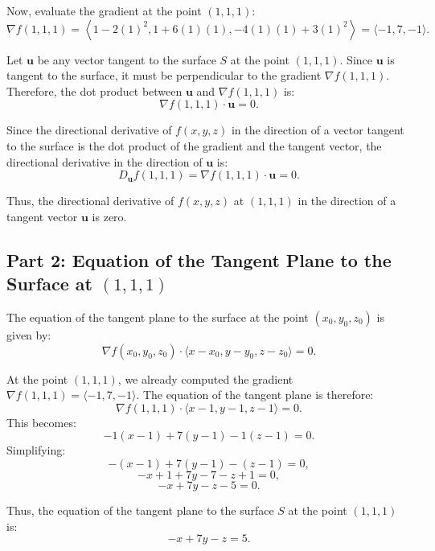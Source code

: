 \documentclass[11pt]{article}
\begin{document}
Now, evaluate the gradient at the point \( (1, 1, 1) \):
\[
\nabla f(1, 1, 1) = \left\langle 1 - 2(1)^2, 1 + 6(1)(1), -4(1)(1) + 3(1)^2 \right\rangle = \langle -1, 7, -1 \rangle.
\]

Let \( \mathbf{u} \) be any vector tangent to the surface \( S \) at the point \( (1, 1, 1) \). Since \( \mathbf{u} \) is tangent to the surface, it must be perpendicular to the gradient \( \nabla f(1, 1, 1) \). Therefore, the dot product between \( \mathbf{u} \) and \( \nabla f(1, 1, 1) \) is:
\[
\nabla f(1, 1, 1) \cdot \mathbf{u} = 0.
\]

Since the directional derivative of \( f(x, y, z) \) in the direction of a vector tangent to the surface is the dot product of the gradient and the tangent vector, the directional derivative in the direction of \( \mathbf{u} \) is:
\[
D_{\mathbf{u}} f(1, 1, 1) = \nabla f(1, 1, 1) \cdot \mathbf{u} = 0.
\]

Thus, the directional derivative of \( f(x, y, z) \) at \( (1, 1, 1) \) in the direction of a tangent vector \( \mathbf{u} \) is zero.

\newpage

\subsection{Part 2: Equation of the Tangent Plane to the Surface at \( (1, 1, 1) \)}

The equation of the tangent plane to the surface at the point \( (x_0, y_0, z_0) \) is given by:
\[
\nabla f(x_0, y_0, z_0) \cdot \langle x - x_0, y - y_0, z - z_0 \rangle = 0.
\]

At the point \( (1, 1, 1) \), we already computed the gradient \( \nabla f(1, 1, 1) = \langle -1, 7, -1 \rangle \). The equation of the tangent plane is therefore:
\[
\nabla f(1, 1, 1) \cdot \langle x - 1, y - 1, z - 1 \rangle = 0.
\]
This becomes:
\[
-1(x - 1) + 7(y - 1) - 1(z - 1) = 0.
\]
Simplifying:
\[
-(x - 1) + 7(y - 1) - (z - 1) = 0,
\]
\[
-x + 1 + 7y - 7 - z + 1 = 0,
\]
\[
-x + 7y - z - 5 = 0.
\]

Thus, the equation of the tangent plane to the surface \( S \) at the point \( (1, 1, 1) \) is:
\[
-x + 7y - z = 5.
\]
\end{document}
